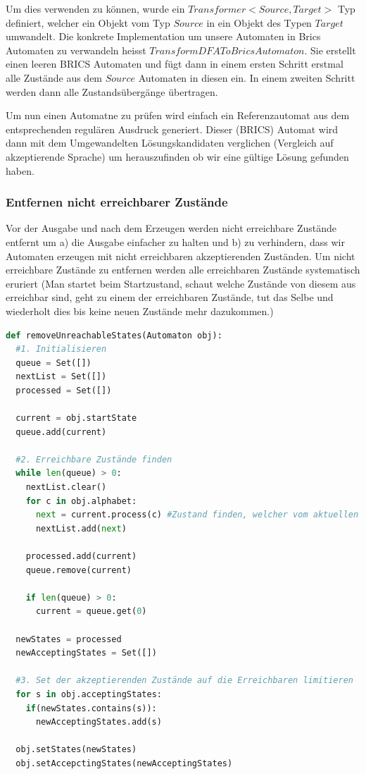 Um dies verwenden zu können, wurde ein $Transformer<Source, Target>$ Typ definiert, welcher ein Objekt vom Typ $Source$ in ein Objekt des Typen $Target$ umwandelt. Die konkrete Implementation um unsere Automaten in Brics Automaten zu verwandeln heisst $TransformDFAToBricsAutomaton$. Sie erstellt einen leeren BRICS Automaten und fügt dann in einem ersten Schritt erstmal alle Zustände aus dem $Source$ Automaten in diesen ein. In einem zweiten Schritt werden dann alle Zustandsübergänge übertragen.

Um nun einen Automatne zu prüfen wird einfach ein Referenzautomat aus dem entsprechenden regulären Ausdruck generiert. Dieser (BRICS) Automat wird dann mit dem Umgewandelten Lösungskandidaten verglichen (Vergleich auf akzeptierende Sprache) um herauszufinden ob wir eine gültige Lösung gefunden haben.

\subsubsection{Entfernen nicht erreichbarer Zustände}
Vor der Ausgabe und nach dem Erzeugen werden nicht erreichbare Zustände entfernt um a) die Ausgabe einfacher zu halten und b) zu verhindern, dass wir Automaten erzeugen mit nicht erreichbaren akzeptierenden Zuständen. Um nicht erreichbare Zustände zu entfernen werden alle erreichbaren Zustände systematisch eruriert (Man startet beim Startzustand, schaut welche Zustände von diesem aus erreichbar sind, geht zu einem der erreichbaren Zustände, tut das Selbe und wiederholt dies bis keine neuen Zustände mehr dazukommen.)

\begin{lstlisting}[language=Python, caption={Nicht erreichbare Zustände entfernen}]
def removeUnreachableStates(Automaton obj):
  #1. Initialisieren
  queue = Set([])
  nextList = Set([])
  processed = Set([])

  current = obj.startState
  queue.add(current)
  
  #2. Erreichbare Zustände finden
  while len(queue) > 0:
    nextList.clear()
    for c in obj.alphabet:
      next = current.process(c) #Zustand finden, welcher vom aktuellen aus mit dem Buchstaben c erreicht wird
      nextList.add(next)

    processed.add(current)
    queue.remove(current)

    if len(queue) > 0:
      current = queue.get(0)

  newStates = processed
  newAcceptingStates = Set([])

  #3. Set der akzeptierenden Zustände auf die Erreichbaren limitieren
  for s in obj.acceptingStates:
    if(newStates.contains(s)):
      newAcceptingStates.add(s)

  obj.setStates(newStates)
  obj.setAccepctingStates(newAcceptingStates)
\end{lstlisting}